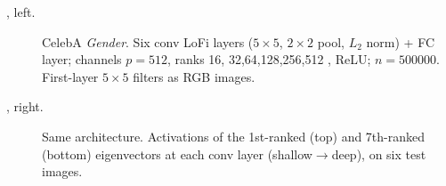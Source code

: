 \begin{description}
  \item[, left.]
    CelebA \emph{Gender}. Six conv LoFi layers
    ($5{\times}5$, $2{\times}2$ pool, $L_2$ norm) + FC layer; channels
    $p=512$, ranks 16, 32,64,128,256,512 , ReLU; $n=500000$. First-layer
    $5{\times}5$ filters as RGB images.

  \item[, right.]
    Same architecture. Activations of the 1st-ranked (top) and 7th-ranked
    (bottom) eigenvectors at each conv layer (shallow$\to$deep), on six test
    images.

\end{description}



